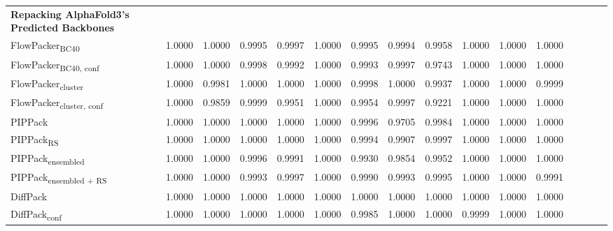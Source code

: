 \begin{table}
{\begin{tabular}{@{}lccccccccccccccc@{}}
            \midrule
            \textbf{Repacking AlphaFold3's Predicted Backbones} & & & & & & & & & \\ 
                \textnormal{\hspace{0.5cm}FlowPacker\textsubscript{BC40}} & 1.0000 & 1.0000 & 0.9995 & 0.9997 & 1.0000 & 0.9995 & 0.9994 & 0.9958 & 1.0000 & 1.0000 & 1.0000 \\
                \textnormal{\hspace{0.5cm}FlowPacker\textsubscript{BC40, conf}} & 1.0000 & 1.0000 & 0.9998 & 0.9992 & 1.0000 & 0.9993 & 0.9997 & 0.9743 & 1.0000 & 1.0000 & 1.0000 \\
                \textnormal{\hspace{0.5cm}FlowPacker\textsubscript{cluster}} & 1.0000 & 0.9981 & 1.0000 & 1.0000 & 1.0000 & 0.9998 & 1.0000 & 0.9937 & 1.0000 & 1.0000 & 0.9999 \\
                \textnormal{\hspace{0.5cm}FlowPacker\textsubscript{cluster, conf}} & 1.0000 & 0.9859 & 0.9999 & 0.9951 & 1.0000 & 0.9954 & 0.9997 & 0.9221 & 1.0000 & 1.0000 & 1.0000 \\
                \textnormal{\hspace{0.5cm}PIPPack} & 1.0000 & 1.0000 & 1.0000 & 1.0000 & 1.0000 & 0.9996 & 0.9705 & 0.9984 & 1.0000 & 1.0000 & 1.0000 \\
                \textnormal{\hspace{0.5cm}PIPPack\textsubscript{RS}} & 1.0000 & 1.0000 & 1.0000 & 1.0000 & 1.0000 & 0.9994 & 0.9907 & 0.9997 & 1.0000 & 1.0000 & 1.0000 \\
                \textnormal{\hspace{0.5cm}PIPPack\textsubscript{ensembled}} & 1.0000 & 1.0000 & 0.9996 & 0.9991 & 1.0000 & 0.9930 & 0.9854 & 0.9952 & 1.0000 & 1.0000 & 1.0000 \\
                \textnormal{\hspace{0.5cm}PIPPack\textsubscript{ensembled + RS}} & 1.0000 & 1.0000 & 0.9993 & 0.9997 & 1.0000 & 0.9990 & 0.9993 & 0.9995 & 1.0000 & 1.0000 & 0.9991 \\
                \textnormal{\hspace{0.5cm}DiffPack} & 1.0000 & 1.0000 & 1.0000 & 1.0000 & 1.0000 & 1.0000 & 1.0000 & 1.0000 & 1.0000 & 1.0000 & 1.0000 \\
                \textnormal{\hspace{0.5cm}DiffPack\textsubscript{conf}} & 1.0000 & 1.0000 & 1.0000 & 1.0000 & 1.0000 & 0.9985 & 1.0000 & 1.0000 & 0.9999 & 1.0000 & 1.0000 \\

\end{tabular}}
\end{table}
